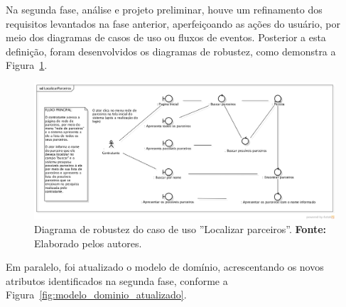 %	


\par Na segunda fase, análise e projeto preliminar, houve um refinamento dos requisitos levantados na fase anterior, aperfeiçoando as ações do usuário, por meio dos diagramas de casos de uso ou fluxos de eventos. Posterior a esta definição, foram desenvolvidos os diagramas de robustez, como demonstra a Figura~\ref{fig:diagrama_robustez_localizar_mao_de_obra}.

\begin{figure}[h!]
	\centerline{\includegraphics[scale=0.35]{./imagens/apendices/diagrama-robustez-localizar-parceiros.png}}
	\caption[Diagrama de robustez do caso de uso ''Localizar parceiros'']
	{Diagrama de robustez do caso de uso ''Localizar parceiros''. \textbf{Fonte:} Elaborado pelos autores.}
	\label{fig:diagrama_robustez_localizar_mao_de_obra}
\end{figure}

Em paralelo, foi atualizado o modelo de domínio, acrescentando os novos atributos identificados na segunda fase, conforme a Figura~\ref{fig:modelo_dominio_atualizado}.

